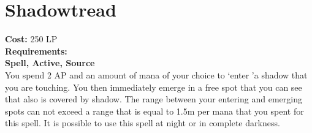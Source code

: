 \section{Shadowtread}\label{spell:shadowtread}
\textbf{Cost:} 250 LP\\
\textbf{Requirements:}\\
\textbf{Spell, Active, Source}\\
You spend 2 AP and an amount of mana of your choice to \lq enter \rq a shadow that you are touching.
You then immediately emerge in a free spot that you can see that also is covered by shadow.
The range between your entering and emerging spots can not exceed a range that is equal to 1.5m per mana that you spent for this spell.
It is possible to use this spell at night or in complete darkness.\\